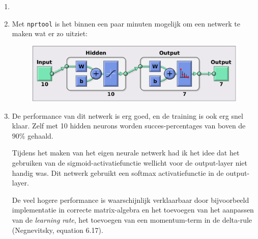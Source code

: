 \documentclass[a4paper,10pt,fleqn]{article}
\begin{document}
\begin{enumerate}[1.]
	\item

	\item Met \verb|nprtool| is het binnen een paar minuten mogelijk om een netwerk te maken wat er zo uitziet:

	\begin{figure}[!h]
		\centering
		\includegraphics[width=.8\textwidth]{images/nprtool-diagram}
	\end{figure}

	\item De performance van dit netwerk is erg goed, en de training is ook erg snel klaar. Zelf met 10 hidden neurons worden succes-percentages van boven de $90\%$ gehaald.

	Tijdens het maken van het eigen neurale netwerk had ik het idee dat het gebruiken van de sigmoid-activatiefunctie wellicht voor de output-layer niet handig was. Dit netwerk gebruikt een softmax activatiefunctie in de output-layer.

	De veel hogere performance is waarschijnlijk verklaarbaar door bijvoorbeeld implementatie in correcte matrix-algebra en het toevoegen van het aanpassen van de \textit{learning rate}, het toevoegen van een momentum-term in de delta-rule (Negnevitsky, equation 6.17).
\end{enumerate}
\end{document}
